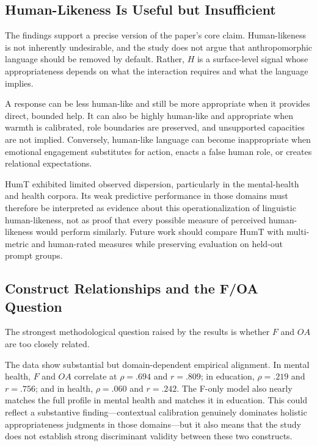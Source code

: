 \documentclass[manuscript,review,anonymous]{acmart}
\begin{document}
\subsection{Human-Likeness Is Useful but Insufficient}

The findings support a precise version of the paper's core claim. Human-likeness is not inherently undesirable, and the study does not argue that anthropomorphic language should be removed by default. Rather, $H$ is a surface-level signal whose appropriateness depends on what the interaction requires and what the language implies.

A response can be less human-like and still be more appropriate when it provides direct, bounded help. It can also be highly human-like and appropriate when warmth is calibrated, role boundaries are preserved, and unsupported capacities are not implied. Conversely, human-like language can become inappropriate when emotional engagement substitutes for action, enacts a false human role, or creates relational expectations.

HumT exhibited limited observed dispersion, particularly in the mental-health and health corpora. Its weak predictive performance in those domains must therefore be interpreted as evidence about this operationalization of linguistic human-likeness, not as proof that every possible measure of perceived human-likeness would perform similarly. Future work should compare HumT with multi-metric and human-rated measures while preserving evaluation on held-out prompt groups.

\subsection{Construct Relationships and the F/OA Question}

The strongest methodological question raised by the results is whether $F$ and $OA$ are too closely related.

The data show substantial but domain-dependent empirical alignment. In mental health, $F$ and $OA$ correlate at $\rho=.694$ and $r=.809$; in education, $\rho=.219$ and $r=.756$; and in health, $\rho=.060$ and $r=.242$. The F-only model also nearly matches the full profile in mental health and matches it in education. This could reflect a substantive finding---contextual calibration genuinely dominates holistic appropriateness judgments in those domains---but it also means that the study does not establish strong discriminant validity between these two constructs.
\end{document}
